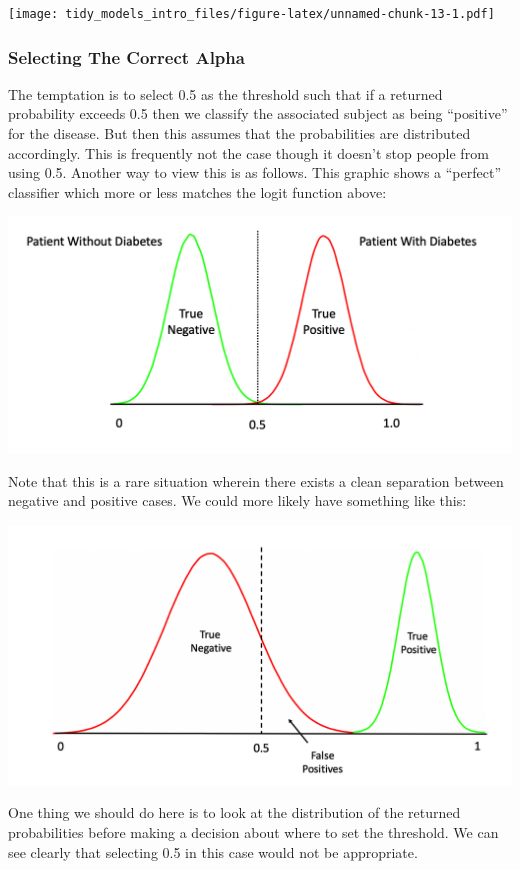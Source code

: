 \documentclass[
]{article}
\begin{document}
\texttt{[image: tidy\_models\_intro\_files/figure-latex/unnamed-chunk-13-1.pdf]}

\hypertarget{selecting-the-correct-alpha}{%
\subsubsection{Selecting The Correct
Alpha}\label{selecting-the-correct-alpha}}

The temptation is to select 0.5 as the threshold such that if a returned
probability exceeds 0.5 then we classify the associated subject as being
``positive'' for the disease. But then this assumes that the
probabilities are distributed accordingly. This is frequently not the
case though it doesn't stop people from using 0.5. Another way to view
this is as follows. This graphic shows a ``perfect'' classifier which
more or less matches the logit function above:

\includegraphics{./IMG/c1.png}

Note that this is a rare situation wherein there exists a clean
separation between negative and positive cases. We could more likely
have something like this:

\includegraphics{./IMG/c3.png}

One thing we should do here is to look at the distribution of the
returned probabilities before making a decision about where to set the
threshold. We can see clearly that selecting 0.5 in this case would not
be appropriate.
\end{document}
